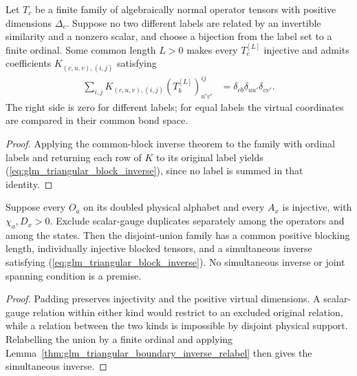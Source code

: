 \begin{lemma}
    \leanok
    \label{thm:glm_triangular_boundary_inverse_relabel}
    Let $T_c$ be a finite family of algebraically normal operator tensors
    with positive dimensions $\Delta_c$. Suppose no two different labels
    are related by an invertible similarity and a nonzero scalar, and
    choose a bijection from the label set to a finite ordinal.
    Some common length $L>0$ makes every $T_c^{[L]}$ injective and admits
    coefficients $K_{(c,u,v),(i,j)}$ satisfying
    \begin{align}
        \sum_{i,j}K_{(c,u,v),(i,j)}
        (T_b^{[L]})^{ij}_{u'v'}
         & =\delta_{cb}\delta_{uu'}\delta_{vv'}.
        \label{eq:glm_triangular_block_inverse}
    \end{align}
    The right side is zero for different labels; for equal labels the
    virtual coordinates are compared in their common bond space.
\end{lemma}
\begin{proof}
    \leanok
    Applying the common-block inverse theorem to the family with ordinal
    labels and returning each row of $K$ to its original label yields
    (\ref{eq:glm_triangular_block_inverse}), since no label is summed in
    that identity.
\end{proof}

\begin{lemma}
    \leanok
    \label{thm:glm_triangular_boundary_inverse}
    Suppose every $O_a$ on its doubled physical alphabet and every $A_x$
    is injective, with $\chi_a,D_x>0$. Exclude scalar-gauge duplicates
    separately among the operators and among the states.
    Then the disjoint-union family has a common positive blocking length,
    individually injective blocked tensors, and a simultaneous inverse
    satisfying (\ref{eq:glm_triangular_block_inverse}).
    No simultaneous inverse or joint spanning condition is a premise.
\end{lemma}
\begin{proof}
    \leanok
    Padding preserves injectivity and the positive virtual dimensions.
    A scalar-gauge relation within either kind would restrict to an
    excluded original relation, while a relation between the two kinds is
    impossible by disjoint physical support. Relabelling the union by a
    finite ordinal and applying
    Lemma~\ref{thm:glm_triangular_boundary_inverse_relabel} then gives the
    simultaneous inverse.
\end{proof}

